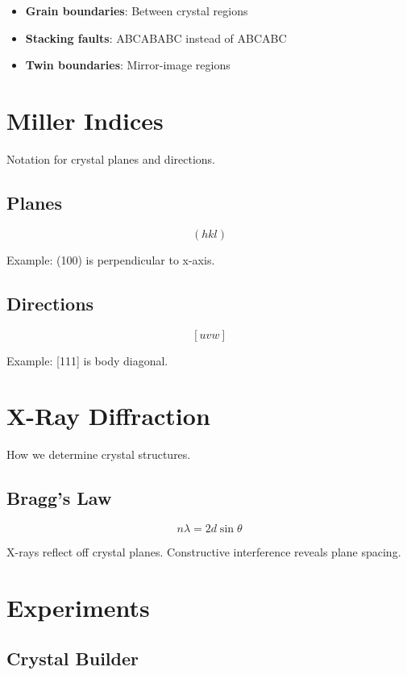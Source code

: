 \documentclass[
  11pt,
  letterpaper,
  twoside,
  openright]{book}
\providecommand{\tightlist}{%
  \setlength{\itemsep}{0pt}\setlength{\parskip}{0pt}}
\begin{document}
\begin{itemize}
\tightlist
\item
  \textbf{Grain boundaries}: Between crystal regions
\item
  \textbf{Stacking faults}: ABCABABC instead of ABCABC
\item
  \textbf{Twin boundaries}: Mirror-image regions
\end{itemize}

\section{Miller Indices}\label{miller-indices}

Notation for crystal planes and directions.

\subsection{Planes}\label{planes}

\[(hkl)\]

Example: (100) is perpendicular to x-axis.

\subsection{Directions}\label{directions}

\[[uvw]\]

Example: {[}111{]} is body diagonal.

\section{X-Ray Diffraction}\label{x-ray-diffraction}

How we determine crystal structures.

\subsection{Bragg's Law}\label{braggs-law}

\[
n\lambda = 2d\sin\theta
\]

X-rays reflect off crystal planes. Constructive interference reveals
plane spacing.

\section{Experiments}\label{experiments-11}

\subsection{Crystal Builder}\label{crystal-builder}
\end{document}
